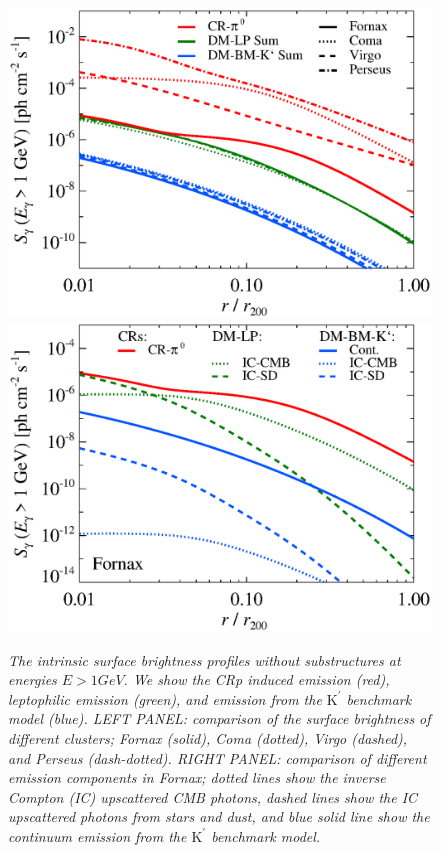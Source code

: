 \documentclass[10pt,aps,pra,reprint,amsmath,amsfonts,amssymb,showpacs,nofootinbib,floatfix]{revtex4-1}
\newcommand{\rmn}{\mathrm}
\newcommand{\Kp}{\rmn{K}^\prime}
\begin{document}
\begin{figure}
\begin{minipage}{2.0\columnwidth}
  \includegraphics[width=0.49\columnwidth]{figures/SB.v11.1GeV.SF300.noSuB.elmu.eps}
  \includegraphics[width=0.49\columnwidth]{figures/SB.fornax.v11.1GeV.SF300.noSuB.elmu.eps}
  \caption{\it The intrinsic surface brightness profiles without
    substructures at energies $E>1 GeV$. We show the CRp induced
    emission (red), leptophilic emission (green), and emission from
    the $\Kp$ benchmark model (blue).  LEFT PANEL: comparison of the surface
    brightness of different clusters; Fornax (solid), Coma (dotted),
    Virgo (dashed), and Perseus (dash-dotted). RIGHT PANEL: comparison of
    different emission components in Fornax; dotted lines show the
    inverse Compton (IC) upscattered CMB photons, dashed lines show
    the IC upscattered photons from stars and dust, and blue solid
    line show the continuum emission from the $\Kp$ benchmark model.}
 \label{fig:SB_clu_nosub}
\end{minipage}
\end{figure}
\end{document}
